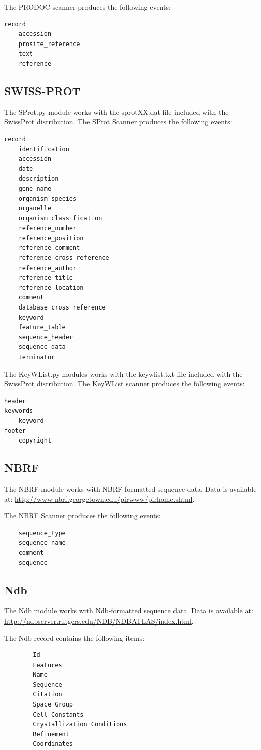 \documentclass{report}
\begin{document}
The PRODOC scanner produces the following events:
\begin{verbatim}
record
    accession
    prosite_reference
    text
    reference
\end{verbatim}


\subsection{SWISS-PROT}
The SProt.py module works with the sprotXX.dat file included with the
SwissProt distribution.
The SProt Scanner produces the following events:
\begin{verbatim}
record
    identification
    accession
    date
    description
    gene_name
    organism_species
    organelle
    organism_classification
    reference_number
    reference_position
    reference_comment
    reference_cross_reference
    reference_author
    reference_title
    reference_location
    comment
    database_cross_reference
    keyword
    feature_table
    sequence_header
    sequence_data
    terminator
\end{verbatim}


The KeyWList.py modules works with the keywlist.txt file included with
the SwissProt distribution.
The KeyWList scanner produces the following events:
\begin{verbatim}
header
keywords
    keyword
footer
    copyright
\end{verbatim}

\subsection{NBRF}

The NBRF module works with NBRF-formatted sequence data.  Data is available at:
\url{http://www-nbrf.georgetown.edu/pirwww/pirhome.shtml}.

The NBRF Scanner produces the following events:
\begin{verbatim}
    sequence_type
    sequence_name
    comment
    sequence
\end{verbatim}

\subsection{Ndb}

The Ndb module works with Ndb-formatted sequence data.  Data is available at:
\url{http://ndbserver.rutgers.edu/NDB/NDBATLAS/index.html}.

The Ndb record contains the following items:
\begin{verbatim}
        Id
        Features
        Name
        Sequence
        Citation
        Space Group
        Cell Constants
        Crystallization Conditions
        Refinement
        Coordinates
\end{verbatim}
\end{document}
